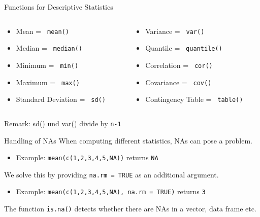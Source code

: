 \documentclass[xcolor=dvipsnames, aspectratio = 169]{beamer}
\begin{document}
\begin{frame}[fragile]{Functions for Descriptive Statistics}
\begin{columns}[T]
	\begin{column}{0.5\textwidth}
		\begin{itemize}
			\item Mean = \verb+ mean() +
			\item Median = \verb+ median() +
			\item Minimum = \verb+ min() +
			\item Maximum = \verb+ max() +
			\item Standard Deviation = \verb+ sd() +
		\end{itemize}
	\end{column}
	\begin{column}{0.5\textwidth}
		\begin{itemize}
			\item Variance = \verb+ var() +
			\item Quantile = \verb+ quantile() +
			\item Correlation = \verb+ cor() +
			\item Covariance = \verb+ cov() +
			\item Contingency Table = \verb+ table() +
		\end{itemize}
	\end{column}
\end{columns}
Remark: sd() und var() divide by \verb+n-1+
\end{frame}

\begin{frame}[fragile]{Handling of NAs}
	When computing different statistics, NAs can pose a problem.\\
	\begin{itemize}
			\item Example: \verb+mean(c(1,2,3,4,5,NA))+ returns \verb+NA+\\
	\end{itemize}
	We solve this by providing \verb+na.rm = TRUE+ as an additional argument.\\
	\begin{itemize}
			\item Example: \verb+mean(c(1,2,3,4,5,NA), na.rm = TRUE)+ returns \verb+3+
	\end{itemize}
	The function \verb+is.na()+ detects whether there are NAs in a vector, data frame etc.
\end{frame}

\end{document}
